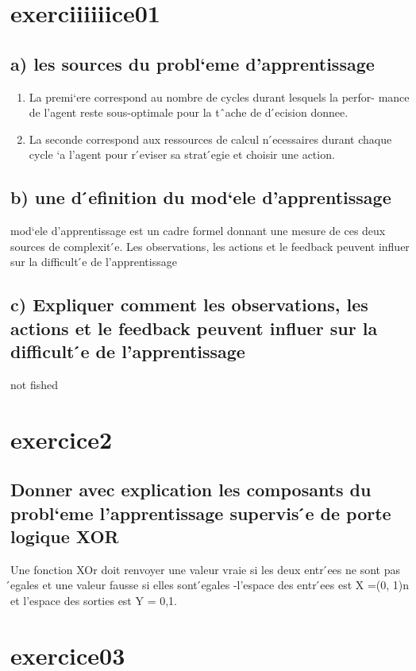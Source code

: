 \documentclass{article}
\begin{document}
\section*{exerciiiiiice01}
    \subsection*{a) les sources du probl`eme d’apprentissage}
    \begin{enumerate}
        \item La premi`ere correspond au nombre de cycles durant lesquels la perfor-
        mance de l’agent reste sous-optimale pour la tˆache de d ́ecision donnee.
        \item La seconde correspond aux ressources de calcul n ́ecessaires durant chaque
        cycle `a l’agent pour r ́eviser sa strat ́egie et choisir une action.



    \end{enumerate}
    \subsection*{b)  une d ́efinition du mod`ele d’apprentissage}
    mod`ele d’apprentissage est un cadre formel donnant une mesure de ces deux
    sources de complexit ́e. Les observations, les actions et le feedback peuvent
    influer sur la difficult ́e de l’apprentissage
    \subsection*{c) Expliquer comment les observations, les actions et le feedback peuvent influer sur la difficult ́e de l’apprentissage}
    not fished


\section*{exercice2}

    \subsection*{Donner avec explication les composants du probl`eme
    l’apprentissage supervis ́e de porte logique XOR}
    Une fonction XOr doit renvoyer une valeur vraie si les deux entr ́ees ne sont
    pas  ́egales et une valeur fausse si elles sont  ́egales -l’espace des entr ́ees est X
    =(0, 1)n et l’espace des sorties est Y = 0,1.
\section*{exercice03}
\end{document}
